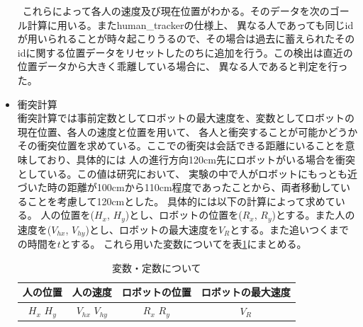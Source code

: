 \documentclass{kuisthesis}
\begin{document}
\begin{itemize}
\ これらによって各人の速度及び現在位置がわかる。そのデータを次のゴール計算に用いる。またhuman\_trackerの仕様上、
異なる人であっても同じidが用いられることが時々起こりうるので、その場合は過去に蓄えられたそのidに関する位置データをリセットしたのちに追加を行う。この検出は直近の位置データから大きく乖離している場合に、
異なる人であると判定を行った。
  \item 衝突計算 \\
  衝突計算では事前定数としてロボットの最大速度を、変数としてロボットの現在位置、各人の速度と位置を用いて、
各人と衝突することが可能かどうかその衝突位置を求めている。ここでの衝突は会話できる距離にいることを意味しており、具体的には
人の進行方向120cm先にロボットがいる場合を衝突としている。この値は研究\cite{mumm2011human}において、
実験の中で人がロボットにもっとも近づいた時の距離が100cmから110cm程度であったことから、両者移動していることを考慮して120cmとした。
具体的には以下の計算によって求めている。
人の位置を($H_x$, $H_y$)とし、ロボットの位置を($R_x$, $R_y$)とする。また人の速度を($V_{hx}$, $V_{hy}$)とし、ロボットの最大速度を$V_R$とする。また追いつくまでの時間を$t$とする。
これら用いた変数についてを表\ref{fig: variable}にまとめる。
\begin{table}[H]
  \centering
  \caption{変数・定数について}
  \label{fig: variable}
  \begin{tabular}{|c|c|c|c|}
    \hline
    人の位置 & 人の速度 & ロボットの位置 & ロボットの最大速度 \\ \hline
    $H_x$  $H_y$ & $V_{hx}$  $V_{hy}$ & $R_x$  $R_y$ & $V_R$ \\ \hline
  \end{tabular}
  

\end{table}
\end{itemize}
\end{document}
